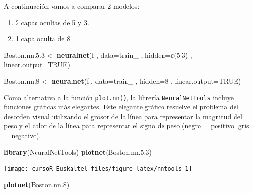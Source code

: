 \documentclass[]{book}
\newenvironment{Shaded}{\begin{snugshade}}{\end{snugshade}}
\newcommand{\KeywordTok}[1]{\textcolor[rgb]{0.13,0.29,0.53}{\textbf{#1}}}
\newcommand{\DataTypeTok}[1]{\textcolor[rgb]{0.13,0.29,0.53}{#1}}
\newcommand{\DecValTok}[1]{\textcolor[rgb]{0.00,0.00,0.81}{#1}}
\newcommand{\FloatTok}[1]{\textcolor[rgb]{0.00,0.00,0.81}{#1}}
\newcommand{\StringTok}[1]{\textcolor[rgb]{0.31,0.60,0.02}{#1}}
\newcommand{\OtherTok}[1]{\textcolor[rgb]{0.56,0.35,0.01}{#1}}
\newcommand{\NormalTok}[1]{#1}
\providecommand{\tightlist}{%
  \setlength{\itemsep}{0pt}\setlength{\parskip}{0pt}}
\begin{document}
A continuación vamos a comparar 2 modelos:

\begin{enumerate}
\def\labelenumi{\arabic{enumi}.}
\tightlist
\item
  2 capas ocultas de 5 y 3.
\item
  1 capa oculta de 8
\end{enumerate}

\begin{Shaded}
\begin{Highlighting}[]
\NormalTok{Boston.nn.}\FloatTok{5.3}\NormalTok{ <-}\StringTok{ }\KeywordTok{neuralnet}\NormalTok{(f}
\NormalTok{                , }\DataTypeTok{data=}\NormalTok{train_}
\NormalTok{                , }\DataTypeTok{hidden=}\KeywordTok{c}\NormalTok{(}\DecValTok{5}\NormalTok{,}\DecValTok{3}\NormalTok{)}
\NormalTok{                , }\DataTypeTok{linear.output=}\OtherTok{TRUE}\NormalTok{)}

\NormalTok{Boston.nn.}\DecValTok{8}\NormalTok{ <-}\StringTok{ }\KeywordTok{neuralnet}\NormalTok{(f}
\NormalTok{                , }\DataTypeTok{data=}\NormalTok{train_}
\NormalTok{                , }\DataTypeTok{hidden=}\DecValTok{8}
\NormalTok{                , }\DataTypeTok{linear.output=}\OtherTok{TRUE}\NormalTok{)}
\end{Highlighting}
\end{Shaded}

Como alternativa a la función \texttt{plot.nn()}, la librería
\texttt{NeuralNetTools} incluye funciones gráficas más elegantes. Este
elegante gráfico resuelve el problema del desorden visual utilizando el
grosor de la línea para representar la magnitud del peso y el color de
la línea para representar el signo de peso (negro = positivo, gris =
negativo).

\begin{Shaded}
\begin{Highlighting}[]
\KeywordTok{library}\NormalTok{(NeuralNetTools)}
\KeywordTok{plotnet}\NormalTok{(Boston.nn.}\FloatTok{5.3}\NormalTok{)}
\end{Highlighting}
\end{Shaded}

\begin{center}\texttt{[image: cursoR\_Euskaltel\_files/figure-latex/nntools-1]} \end{center}

\begin{Shaded}
\begin{Highlighting}[]
\KeywordTok{plotnet}\NormalTok{(Boston.nn.}\DecValTok{8}\NormalTok{)}
\end{Highlighting}
\end{Shaded}
\end{document}
